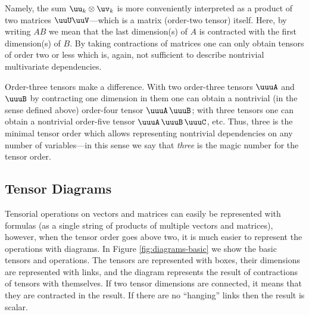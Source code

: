 Namely, the sum $\uu_k\otimes \uv_k$ is more conveniently interpreted as a product of two matrices $\uuU\uuV$---which is a matrix (order-two tensor) itself.
Here, by writing $AB$ we mean that the last dimension(s) of $A$ is contracted with the first dimension(s) of $B$.
By taking contractions of matrices one can only obtain tensors of order two or less which is, again, not sufficient to describe nontrivial multivariate dependencies.

Order-three tensors make a difference.
With two order-three tensors $\uuuA$ and $\uuuB$ by contracting one dimension in them one can obtain a nontrivial (in the sense defined above) order-four tensor $\uuuA\,\uuuB$; with three tensors one can obtain a nontrivial order-five tensor $\uuuA\,\uuuB\, \uuuC$, etc.
Thus, three is the minimal tensor order which allows representing nontrivial dependencies on any number of variables---in this sense we say that \emph{three} is the magic number for the tensor order.

\subsection{Tensor Diagrams}

Tensorial operations on vectors and matrices can easily be represented with formulas (as a single string of products of multiple vectors and matrices), however, when the tensor order goes above two, it is much easier to represent the operations with diagrams.
In Figure \ref{fig:diagrams-basic} we show the basic tensors and operations.
The tensors are represented with boxes, their dimensions are represented with links, and the diagram represents the result of contractions of tensors with themselves.
If two tensor dimensions are connected, it means that they are contracted in the result.
If there are no ``hanging'' links then the result is scalar.

